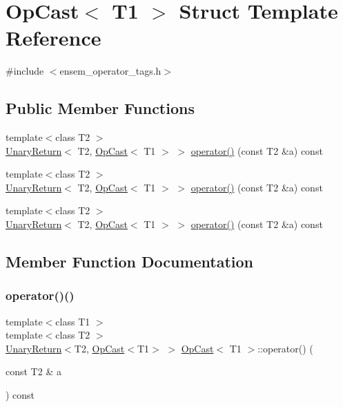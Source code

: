 \hypertarget{structOpCast}{}\section{Op\+Cast$<$ T1 $>$ Struct Template Reference}
\label{structOpCast}


{\ttfamily \#include $<$ensem\+\_\+operator\+\_\+tags.\+h$>$}

\subsection*{Public Member Functions}
\begin{DoxyCompactItemize}
\item 
{\footnotesize template$<$class T2 $>$ }\\\mbox{\hyperlink{structUnaryReturn}{Unary\+Return}}$<$ T2, \mbox{\hyperlink{structOpCast}{Op\+Cast}}$<$ T1 $>$ $>$ \mbox{\hyperlink{structOpCast_a1a390481d419f2e62e4342c10ca6eabf}{operator()}} (const T2 \&a) const
\item 
{\footnotesize template$<$class T2 $>$ }\\\mbox{\hyperlink{structUnaryReturn}{Unary\+Return}}$<$ T2, \mbox{\hyperlink{structOpCast}{Op\+Cast}}$<$ T1 $>$ $>$ \mbox{\hyperlink{structOpCast_a1a390481d419f2e62e4342c10ca6eabf}{operator()}} (const T2 \&a) const
\item 
{\footnotesize template$<$class T2 $>$ }\\\mbox{\hyperlink{structUnaryReturn}{Unary\+Return}}$<$ T2, \mbox{\hyperlink{structOpCast}{Op\+Cast}}$<$ T1 $>$ $>$ \mbox{\hyperlink{structOpCast_a1a390481d419f2e62e4342c10ca6eabf}{operator()}} (const T2 \&a) const
\end{DoxyCompactItemize}


\subsection{Member Function Documentation}
\mbox{\label{structOpCast_a1a390481d419f2e62e4342c10ca6eabf}} 
\subsubsection{\texorpdfstring{operator()()}{operator()()}\hspace{0.1cm}{\footnotesize\ttfamily [1/3]}}
{\footnotesize\ttfamily template$<$class T1 $>$ \\
template$<$class T2 $>$ \\
\mbox{\hyperlink{structUnaryReturn}{Unary\+Return}}$<$T2, \mbox{\hyperlink{structOpCast}{Op\+Cast}}$<$T1$>$ $>$ \mbox{\hyperlink{structOpCast}{Op\+Cast}}$<$ T1 $>$\+::operator() (\begin{DoxyParamCaption}\item[{const T2 \&}]{a }\end{DoxyParamCaption}) const\hspace{0.3cm}{\ttfamily [inline]}}

